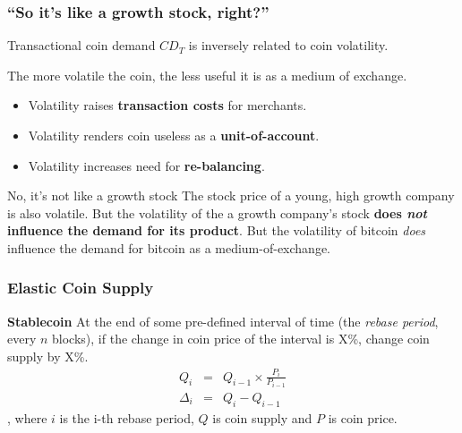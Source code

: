 \documentclass{beamer}
\begin{document}
\begin{frame}
  \frametitle{``So it's like a growth stock, right?''}

  \begin{block}{}
    Transactional coin demand $CD_{T}$ is inversely related to coin
    volatility.
  \end{block}

  The more volatile the coin, the less useful it is as a medium of
  exchange.

  \begin{itemize}
  \item Volatility raises \textbf{transaction costs} for merchants.
  \item Volatility renders coin useless as a \textbf{unit-of-account}.
  \item Volatility increases need for \textbf{re-balancing}.
  \end{itemize}

  \begin{block}{No, it's not like a growth stock}
    The stock price of a young, high growth company is also
    volatile. But the volatility of the a growth company's stock
    \textbf{does \emph{not} influence the demand for its product}. But
    the volatility of bitcoin \emph{does} influence the demand for
    bitcoin as a medium-of-exchange.
  \end{block}
\end{frame}

\begin{frame}
  \frametitle{Elastic Coin Supply}
  \begin{block}{\textbf{Stablecoin}}
    At the end of some pre-defined interval of time (the \emph{rebase
      period}, every $n$ blocks), if the change in coin price of the
    interval is X\%, change coin supply by X\%.
    \begin{eqnarray*}
      Q_{i} &=& Q_{i-1} \times \frac{P_{i}}{P_{i-1}}\\
      \Delta_{i} &=& Q_{i} - Q_{i-1}
    \end{eqnarray*}
    , where $i$ is the i-th rebase period, $Q$ is coin supply and $P$
    is coin price.
  \end{block}
\end{frame}
\end{document}
